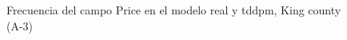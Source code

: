 \begin{figure}[H]
    \centering
    
    \caption{Frecuencia del campo Price en el modelo real y tddpm, King county (A-3)}
    \label{frecuency-tddpm-price}
\end{figure}